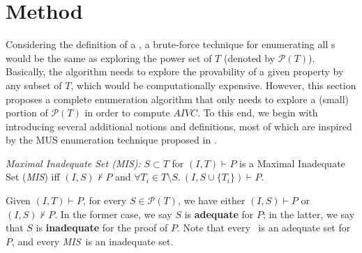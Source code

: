 \section{Method}
\label{sec:allivcs}

\newcommand{\getivc}{\textsc{GetIVC}}
\newcommand{\getmodel}{\textsc{GetLiteralsFromMaxModel}}
\newcommand{\aivcalg}{\texttt{\small{All\_IVCs}}}
\newcommand{\blockup}{\textsc{BlockUp}}
\newcommand{\blockdown}{\textsc{BlockDown}}
\newcommand{\mis}{\textit{MIS}}
\newcommand{\mcs}{\textit{MCS}}


\newcommand{\checksat}{\textsc{CheckSat}}
\newcommand{\isadeq}{\textsc{CheckAdq}}
\newcommand{\actlit}{\textsc{ActLit}}
\newcommand{\unsatcore}{\textsc{UnsatCore}\xspace}
\newcommand{\unsat}{\texttt{UNSAT}\xspace}
\newcommand{\sat}{\texttt{SAT}\xspace}

Considering the definition of a \mivc, a brute-force technique for enumerating all \mivc s would be the same as exploring the power set of $T$ (denoted by $ \mathcal{P}(T) $).
Basically, the algorithm needs to explore the provability of a
given property by any subset of $T$, which would be computationally expensive.
However, this section proposes a complete
enumeration algorithm that only needs to explore a (small) portion of $\mathcal{P}(T)$
in order to compute $AIVC$. To this end, we begin with introducing several additional notions and definitions, most of which are inspired by the MUS enumeration technique proposed in \cite{marco2016fast}.


\begin{definition}{\emph{Maximal Inadequate Set (\mis):}}
  \label{def:mis}
  $S \subset T$ for $(I, T) \vdash P$ is a Maximal Inadequate Set (\mis) iff
  $(I, S) \nvdash P$ and $\forall T_i \in T\setminus S.~ (I, S\cup\{T_i\}) \vdash P$.
\end{definition}

Given $(I, T) \vdash P$, for every $S \in \mathcal{P}(T)$, we have either $(I, S) \vdash P$ or $(I, S) \nvdash P$. In the former case, we say $S$ is \textbf{adequate} for $P$; in the latter, we say that $S$ is \textbf{inadequate} for the proof of $P$.
Note that every \ivc ~is an adequate set for $P$, and every \mis ~is an inadequate set.


